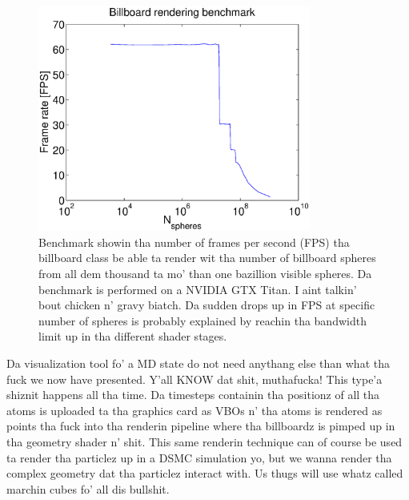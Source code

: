 \begin{figure}[htb]
\begin{center}
\includegraphics[width=0.8\textwidth, trim=0cm 0cm 0cm 0cm, clip]{visualization/figures/benchmark.eps}
\end{center}
\caption{Benchmark showin tha number of frames per second (FPS) tha billboard class be able ta render wit tha number of billboard spheres from all dem thousand ta mo' than one bazillion visible spheres. Da benchmark is performed on a NVIDIA GTX Titan. I aint talkin' bout chicken n' gravy biatch. Da sudden drops up in FPS at specific number of spheres is probably explained by reachin tha bandwidth limit up in tha different shader stages.}
\label{fig:rendering_benchmark}
\end{figure}
Da visualization tool fo' a MD state do not need anythang else than what tha fuck we now have presented. Y'all KNOW dat shit, muthafucka! This type'a shiznit happens all tha time. Da timesteps containin tha positionz of all tha atoms is uploaded ta tha graphics card as VBOs n' tha atoms is rendered as points tha fuck into tha renderin pipeline where tha billboardz is pimped up in tha geometry shader n' shit. This same renderin technique can of course be used ta render tha particlez up in a DSMC simulation yo, but we wanna render tha complex geometry dat tha particlez interact with. Us thugs will use whatz called marchin cubes fo' all dis bullshit.